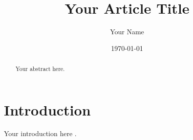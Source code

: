 \documentclass{article}
\title{Your Article Title}
\author{Your Name}
\date{\today}
\begin{document}
\maketitle

\begin{abstract}
Your abstract here.
\end{abstract}

\section{Introduction}
Your introduction here \cite{example}.



\end{document}
